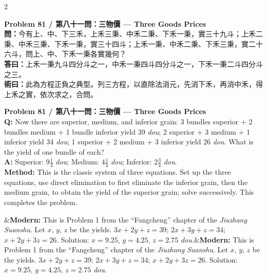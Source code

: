 \documentclass[11pt,a4paper]{article}
\newcommand{\bilingualproblem}[4]{%
  \begin{paracol}{2}
  \begin{leftcolumn}
  \noindent\textbf{\color{problemcolor}#1}\\[0.2cm]
  #2
  \end{leftcolumn}
  \switchcolumn
  \noindent\textbf{\color{problemcolor}#1}\\[0.2cm]
  #3
  \end{paracol}
  \ifx&#4&\else\vspace{0.3cm}\noindent#4\fi
  \vspace{0.5cm}
}
\newcommand{\wen}[1]{\textcolor{problemcolor}{\textbf{問：}}#1}
\newcommand{\da}[1]{\textcolor{answercolor}{\textbf{答曰：}}#1}
\newcommand{\shu}[1]{\textcolor{methodcolor}{\textbf{術曰：}}#1}
\newcommand{\wenen}[1]{\textcolor{problemcolor}{\textbf{Q:}} #1}
\newcommand{\daen}[1]{\textcolor{answercolor}{\textbf{A:}} #1}
\newcommand{\shuen}[1]{\textcolor{methodcolor}{\textbf{Method:}} #1}
\begin{document}
\bilingualproblem{Problem 81 / 第八十一問：三物價 --- Three Goods Prices}{
\wen{今有上、中、下三禾，上禾三秉、中禾二秉、下禾一秉，實三十九斗；上禾二秉、中禾三秉、下禾一秉，實三十四斗；上禾一秉、中禾二秉、下禾三秉，實二十六斗，問上、中、下禾一秉各實幾何？}\\[0.2cm]
\da{上禾一秉九斗四分斗之一，中禾一秉四斗四分斗之一，下禾一秉二斗四分斗之三。}\\[0.2cm]
\shu{此為方程正負之典型。列三方程，以直除法消元，先消下禾，再消中禾，得上禾之實，依次求之，合問。}
}{
\wenen{Now there are superior, medium, and inferior grain: 3 bundles superior + 2 bundles medium + 1 bundle inferior yield 39 \textit{dou}; 2 superior + 3 medium + 1 inferior yield 34 \textit{dou}; 1 superior + 2 medium + 3 inferior yield 26 \textit{dou}. What is the yield of one bundle of each?}\\[0.2cm]
\daen{Superior: $9\frac{1}{4}$ \textit{dou}; Medium: $4\frac{1}{4}$ \textit{dou}; Inferior: $2\frac{3}{4}$ \textit{dou}.}\\[0.2cm]
\shuen{This is the classic system of three equations. Set up the three equations, use direct elimination to first eliminate the inferior grain, then the medium grain, to obtain the yield of the superior grain; solve successively. This completes the problem.}
}{\textbf{Modern:} This is Problem 1 from the ``Fangcheng'' chapter of the \textit{Jiuzhang Suanshu}. Let $x$, $y$, $z$ be the yields. $3x + 2y + z = 39$; $2x + 3y + z = 34$; $x + 2y + 3z = 26$. Solution: $x = 9.25$, $y = 4.25$, $z = 2.75$ \textit{dou}.}

\newpage
\end{document}
